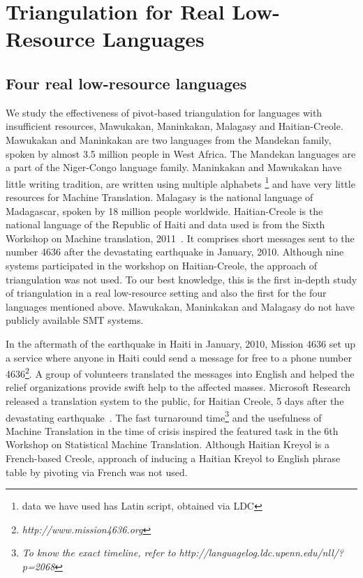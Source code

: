 \chapter{Triangulation for Real Low-Resource Languages}
\label{chapter:reality}

\section{Four real low-resource languages}
We study the effectiveness of pivot-based triangulation for languages with insufficient resources, Mawukakan, Maninkakan, Malagasy and Haitian-Creole. Mawukakan and Maninkakan are two languages from the Mandekan family, spoken by almost 3.5 million people in West Africa. The Mandekan languages are a part of the Niger-Congo language family. Maninkakan and Mawukakan have little writing tradition, are written using multiple alphabets \footnote{data we have used has Latin script, obtained via LDC} and have very little resources for Machine Translation. Malagasy is the national language of Madagascar, spoken by 18 million people worldwide. Haitian-Creole is the national language of the Republic of Haiti and data used is from the Sixth Workshop on Machine translation, 2011~\cite{WMT:11}. It comprises short messages sent to the number 4636 after the devastating earthquake in January, 2010. Although nine systems participated in the workshop on Haitian-Creole, the approach of triangulation was not used. To our best knowledge, this is the first in-depth study of triangulation in a real low-resource setting and also the first for the four languages mentioned above. Mawukakan, Maninkakan and Malagasy do not have publicly available SMT systems. 

In the aftermath of the earthquake in Haiti in January, 2010, Mission 4636 set up a service where anyone in Haiti could send a message for free to a phone number 4636\footnote{\emph{http://www.mission4636.org}}. A group of volunteers translated the messages into English and helped the relief organizations provide swift help to the affected masses.  Microsoft Research released a translation system to the public, for Haitian Creole, 5 days after the devastating earthquake~\cite{Lewis:11}. The fast turnaround time\footnote{\emph{To know the exact timeline, refer to http://languagelog.ldc.upenn.edu/nll/?p=2068}} and the usefulness of Machine Translation in the time of crisis inspired the featured task in the 6th Workshop on Statistical Machine Translation. Although Haitian Kreyol is a French-based Creole, approach of inducing a Haitian Kreyol to English phrase table by pivoting via French was not used.

